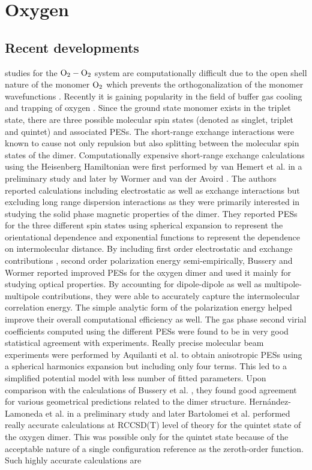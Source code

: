 \chapter{Oxygen}
\section{Recent developments}
    \Abinitio{} studies for the ${\rm O_2 - O_2}$ system are computationally difficult due to the open shell nature of the monomer $\rm{O_2}$ which prevents the orthogonalization of the monomer wavefunctions \cite{Bussery1993}. Recently it is gaining popularity in the field of buffer gas cooling and trapping of oxygen \cite{Friedrich1998,Avdeenkov2001}. Since the ground state monomer exists in the triplet state, there are three possible molecular spin states (denoted as singlet, triplet and quintet) and associated PESs. The short-range exchange interactions were known to cause not only repulsion but also splitting between the molecular spin states of the dimer. Computationally expensive short-range exchange calculations using the Heisenberg Hamiltonian were first performed by van Hemert et al. \cite{vanHemert1983} in a preliminary study and later by Wormer and van der Avoird \cite{Wormer1984}. The authors reported \abinitio{} calculations including electrostatic as well as exchange interactions but excluding long range dispersion interactions as they were primarily interested in studying the solid phase magnetic properties of the dimer. They reported PESs for the three different spin states using spherical expansion to represent the orientational dependence and exponential functions to represent the dependence on intermolecular distance.  By including first order electrostatic and exchange contributions \abinitio{}, second order polarization energy semi-empirically, Bussery and Wormer \cite{Bussery1993} reported improved PESs for the oxygen dimer and used it mainly for studying optical properties. By accounting for dipole-dipole as well as multipole-multipole contributions, they were able to accurately capture the intermolecular correlation energy. The simple analytic form of the polarization energy helped improve their overall computational efficiency as well. The gas phase second virial coefficients computed using the different PESs were found to be in very good statistical agreement with experiments. Really precise molecular beam experiments were performed by Aquilanti et al. \cite{Aquilanti1999} to obtain anisotropic PESs using a spherical harmonics expansion but including only four terms. This led to a simplified potential model with less number of fitted parameters. Upon comparison with the \abinitio{} calculations of Bussery et al. \cite{Bussery1993}, they found good agreement for various geometrical predictions related to the dimer structure. Hernández-Lamoneda et al. \cite{Lamoneda2005CPL} in a preliminary study and later Bartolomei et al. \cite{Bartolomei2008} performed really accurate \abinitio{} calculations at RCCSD(T) level of theory for the quintet state of the oxygen dimer. This was possible only for the quintet state because of the acceptable nature of a single configuration reference as the zeroth-order function. Such highly accurate calculations are 